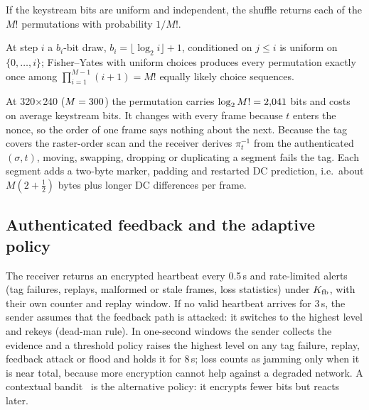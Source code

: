 \begin{proposition}\label{prop:perm}
If the keystream bits are uniform and independent, the shuffle returns each of the $M!$ permutations with probability $1/M!$.
\end{proposition}
\begin{IEEEproof}
At step $i$ a $b_i$-bit draw, $b_i = \lfloor \log_2 i \rfloor + 1$, conditioned on $j \le i$ is uniform on $\{0, \ldots, i\}$; Fisher--Yates with uniform choices produces every permutation exactly once among $\prod_{i=1}^{M-1}(i+1) = M!$ equally likely choice sequences.
\end{IEEEproof}
At 320$\times$240 ($M = 300$) the permutation carries $\log_2 M! = 2{,}041$ bits and costs on average \FyBitsQVGA{} keystream bits. It changes with every frame because $t$ enters the nonce, so the order of one frame says nothing about the next. Because the tag covers the raster-order scan and the receiver derives $\pi_t^{-1}$ from the authenticated $(\sigma, t)$, moving, swapping, dropping or duplicating a segment fails the tag. Each segment adds a two-byte marker, padding and restarted DC prediction, i.e.\ about $M(2 + \tfrac12)$ bytes plus longer DC differences per frame.

\subsection{Authenticated feedback and the adaptive policy}\label{sec:feedback}
The receiver returns an encrypted heartbeat every 0.5\,s and rate-limited alerts (tag failures, replays, malformed or stale frames, loss statistics) under $K_{\mathrm{fb}}$, with their own counter and replay window. If no valid heartbeat arrives for 3\,s, the sender assumes that the feedback path is attacked: it switches to the highest level and rekeys (dead-man rule). In one-second windows the sender collects the evidence and a threshold policy raises the highest level on any tag failure, replay, feedback attack or flood and holds it for 8\,s; loss counts as jamming only when it is near total, because more encryption cannot help against a degraded network. A contextual bandit~\cite{sutton2018} is the alternative policy: it encrypts fewer bits but reacts later.
